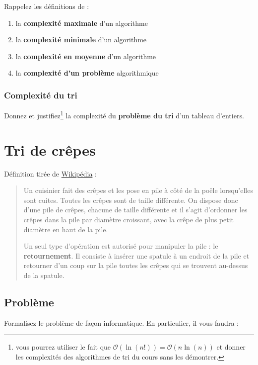 \documentclass
[12pt]
{article}
\begin{document}
Rappelez les définitions de :

\begin{enumerate}
    \item la {\bf complexité maximale} d'un algorithme
    \item la {\bf complexité minimale} d'un algorithme
    \item la {\bf complexité en moyenne} d'un algorithme
    \item la {\bf complexité d'un problème} algorithmique
\end{enumerate}

\subsubsection{Complexité du tri}

Donnez et justifiez\footnote{vous pourrez utiliser le fait que $\mathcal{O}(\ln(n!)) = \mathcal{O}(n\ln(n))$ et donner les complexités des algorithmes de tri du cours sans les démontrer.} la complexité du {\bf problème du tri} d'un tableau d'entiers.


\section{Tri de crêpes}

Définition tirée de \href{https://fr.wikipedia.org/wiki/Tri_de_cr%C3%AApes#Contexte}{Wikipédia} :

\begin{verse}
Un cuisinier fait des crêpes et les pose en pile à côté de la poêle lorsqu'elles sont cuites. Toutes les crêpes sont de taille différente. On dispose donc d'une pile de crêpes, chacune de taille différente et il s'agit d'ordonner les crêpes dans la pile par diamètre croissant, avec la crêpe de plus petit diamètre en haut de la pile.

Un seul type d'opération est autorisé pour manipuler la pile : le {\bf retournement}. Il consiste à insérer une spatule à un endroit de la pile et retourner d'un coup sur la pile toutes les crêpes qui se trouvent au-dessus de la spatule.   
\end{verse}

\subsection{Problème}

Formalisez le problème de façon informatique. En particulier, il vous faudra :
\end{document}

